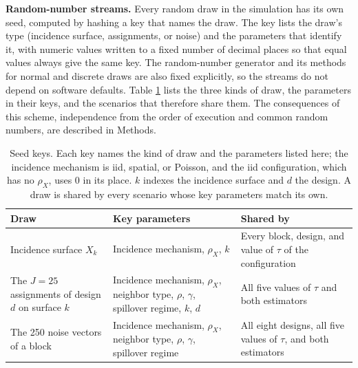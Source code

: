 \documentclass[11pt]{article}
\begin{document}
\textbf{Random-number streams.} Every random draw in the simulation has
its own seed, computed by hashing a key that names the draw. The key
lists the draw's type (incidence surface, assignments, or noise) and the
parameters that identify it, with numeric values written to a fixed
number of decimal places so that equal values always give the same key.
The random-number generator and its methods for normal and discrete
draws are also fixed explicitly, so the streams do not depend on
software defaults. Table \ref{tab:seed-keys} lists the three kinds of
draw, the parameters in their keys, and the scenarios that therefore
share them. The consequences of this scheme, independence from the order
of execution and common random numbers, are described in Methods.

\begin{table}[!htb]

\small
\centering

\caption{Seed keys. Each key names the kind of draw and the parameters listed here; the incidence mechanism is iid, spatial, or Poisson, and the iid configuration, which has no $\rho_X$, uses 0 in its place. $k$ indexes the incidence surface and $d$ the design. A draw is shared by every scenario whose key parameters match its own.}
\label{tab:seed-keys}

\begin{tabular}{p{4.2cm}p{5.0cm}p{5.2cm}}

\toprule
Draw & Key parameters & Shared by \\

\midrule
Incidence surface $X_k$ & Incidence mechanism, $\rho_X$, $k$ & Every block, design, and value of $\tau$ of the configuration \\
The $J = 25$ assignments of design $d$ on surface $k$ & Incidence mechanism, $\rho_X$, neighbor type, $\rho$, $\gamma$, spillover regime, $k$, $d$ & All five values of $\tau$ and both estimators \\
The 250 noise vectors of a block & Incidence mechanism, $\rho_X$, neighbor type, $\rho$, $\gamma$, spillover regime & All eight designs, all five values of $\tau$, and both estimators \\

\bottomrule

\end{tabular}

\end{table}
\end{document}
